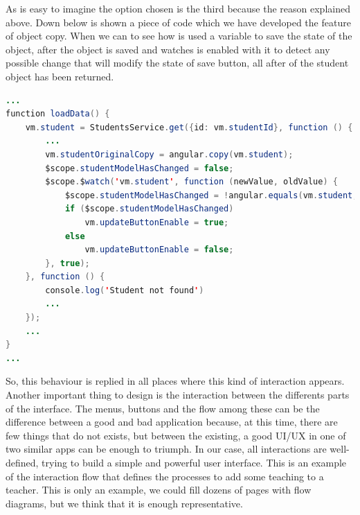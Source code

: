 \noindent As is easy to imagine the option chosen is the third because the reason explained
above. Down below is shown a piece of code which we have developed the feature of object copy.
When we can to see how is used a variable to save the state of the object, after
the object is saved and watches is enabled with it to detect any possible change
that will modify the state of save button, all after of the student object has been returned.

\begin{lstlisting}[language=java,frame=none, title=studentProfile.js]
...
function loadData() {
    vm.student = StudentsService.get({id: vm.studentId}, function () {
        ...
        vm.studentOriginalCopy = angular.copy(vm.student);
        $scope.studentModelHasChanged = false;
        $scope.$watch('vm.student', function (newValue, oldValue) {
            $scope.studentModelHasChanged = !angular.equals(vm.student, vm.studentOriginalCopy);
            if ($scope.studentModelHasChanged)
                vm.updateButtonEnable = true;
            else
                vm.updateButtonEnable = false;
        }, true);
    }, function () {
        console.log('Student not found')
        ...
    });
    ...
}
...
\end{lstlisting}

\noindent So, this behaviour is replied in all places where this kind of interaction appears.
\intro
Another important thing to design is the interaction between the differents parts
of the interface. The menus, buttons and the flow among these can be the difference
between a good and bad application because, at this time, there are few things
that do not exists, but between the existing, a good UI/UX in one of two similar
apps can be enough to triumph.
\intro
In our case, all interactions are well-defined, trying to build a simple and
powerful user interface. This is an example of the interaction flow that defines
the processes to add some teaching to a teacher.
This is only an example, we could fill dozens of pages with flow diagrams, but
we think that it is enough representative.




%

